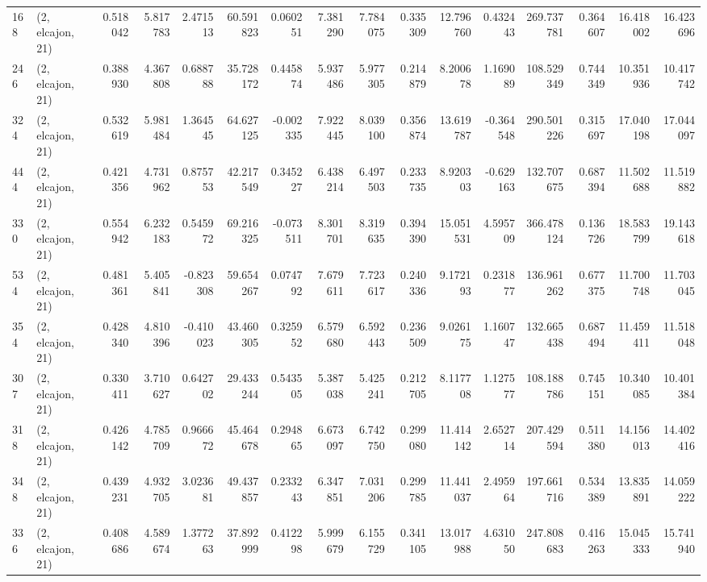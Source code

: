 \begin{tabular}{llrrrrrrrrrrrrrr}
168 &  (2, elcajon, 21) &   0.518042 &   5.817783 &   2.471513 &    60.591823 &   0.060251 &   7.381290 &   7.784075 &  0.335309 &  12.796760 &   0.432443 &   269.737781 &  0.364607 &  16.418002 &  16.423696 \\
246 &  (2, elcajon, 21) &   0.388930 &   4.367808 &   0.688788 &    35.728172 &   0.445874 &   5.937486 &   5.977305 &  0.214879 &   8.200678 &   1.169089 &   108.529349 &  0.744349 &  10.351936 &  10.417742 \\
324 &  (2, elcajon, 21) &   0.532619 &   5.981484 &   1.364545 &    64.627125 &  -0.002335 &   7.922445 &   8.039100 &  0.356874 &  13.619787 &  -0.364548 &   290.501226 &  0.315697 &  17.040198 &  17.044097 \\
444 &  (2, elcajon, 21) &   0.421356 &   4.731962 &   0.875753 &    42.217549 &   0.345227 &   6.438214 &   6.497503 &  0.233735 &   8.920303 &  -0.629163 &   132.707675 &  0.687394 &  11.502688 &  11.519882 \\
330 &  (2, elcajon, 21) &   0.554942 &   6.232183 &   0.545972 &    69.216325 &  -0.073511 &   8.301701 &   8.319635 &  0.394390 &  15.051531 &   4.595709 &   366.478124 &  0.136726 &  18.583799 &  19.143618 \\
534 &  (2, elcajon, 21) &   0.481361 &   5.405841 &  -0.823308 &    59.654267 &   0.074792 &   7.679611 &   7.723617 &  0.240336 &   9.172193 &   0.231877 &   136.961262 &  0.677375 &  11.700748 &  11.703045 \\
354 &  (2, elcajon, 21) &   0.428340 &   4.810396 &  -0.410023 &    43.460305 &   0.325952 &   6.579680 &   6.592443 &  0.236509 &   9.026175 &   1.160747 &   132.665438 &  0.687494 &  11.459411 &  11.518048 \\
307 &  (2, elcajon, 21) &   0.330411 &   3.710627 &   0.642702 &    29.433244 &   0.543505 &   5.387038 &   5.425241 &  0.212705 &   8.117708 &   1.127577 &   108.188786 &  0.745151 &  10.340085 &  10.401384 \\
318 &  (2, elcajon, 21) &   0.426142 &   4.785709 &   0.966672 &    45.464678 &   0.294865 &   6.673097 &   6.742750 &  0.299080 &  11.414142 &   2.652714 &   207.429594 &  0.511380 &  14.156013 &  14.402416 \\
348 &  (2, elcajon, 21) &   0.439231 &   4.932705 &   3.023681 &    49.437857 &   0.233243 &   6.347851 &   7.031206 &  0.299785 &  11.441037 &   2.495964 &   197.661716 &  0.534389 &  13.835891 &  14.059222 \\
336 &  (2, elcajon, 21) &   0.408686 &   4.589674 &   1.377263 &    37.892999 &   0.412298 &   5.999679 &   6.155729 &  0.341105 &  13.017988 &   4.631050 &   247.808683 &  0.416263 &  15.045333 &  15.741940 \\

\end{tabular}

